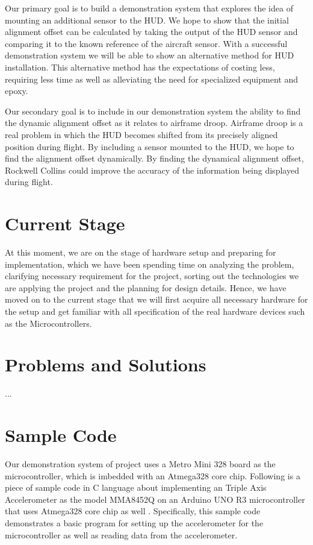 \documentclass[letterpaper,10pt,onecolumn]{IEEEtran}
\begin{document}
Our primary goal is to build a demonstration system that explores the idea of mounting an additional sensor to the HUD. We hope to show that the initial alignment offset can be calculated by taking the output of the HUD sensor and comparing it to the known reference of the aircraft sensor. With a successful demonstration system we will be able to show an alternative method for HUD installation. This alternative method has the expectations of costing less, requiring less time as well as alleviating the need for specialized equipment and epoxy.


Our secondary goal is to include in our demonstration system the ability to find the dynamic alignment offset as it relates to airframe droop. Airframe droop is a real problem in which the HUD becomes shifted from its precisely aligned position during flight. By including a sensor mounted to the HUD, we hope to find the alignment offset dynamically. By finding the dynamical alignment offset, Rockwell Collins could improve the accuracy of the information being displayed during flight.

\section{Current Stage}
At this moment, we are on the stage of hardware setup and preparing for implementation, which we have been spending time on analyzing the problem, clarifying necessary requirement for the project, sorting out the technologies we are applying the project and the planning for design details. Hence, we have moved on to the current stage that we will first acquire all necessary hardware for the setup and get familiar with all specification of the real hardware devices such as the Microcontrollers.

\section{Problems and Solutions}
...


\section{Sample Code}
Our demonstration system of project uses a Metro Mini 328 board as the microcontroller, which is imbedded with an Atmega328 core chip. Following is a piece of sample code in C language about implementing an Triple Axis Accelerometer as the model MMA8452Q on an Arduino UNO R3 microcontroller that uses Atmega328 core chip as well \cite{sampleCode}. Specifically, this sample code demonstrates a basic program for setting up the accelerometer for the microcontroller as well as reading data from the accelerometer.\\
\end{document}
